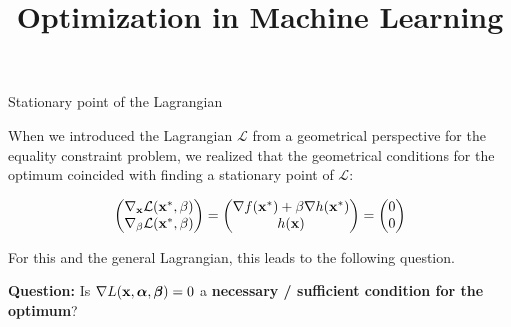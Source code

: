 \documentclass[11pt,compress,t,notes=noshow, xcolor=table]{beamer}
\title{Optimization in Machine Learning}
\begin{document}

\begin{vbframe}{Stationary point of the Lagrangian}

When we introduced the Lagrangian $\mathcal{L}$ from a geometrical
perspective for the equality constraint problem, 
we realized that the geometrical conditions for the optimum
coincided with finding a stationary point of $\mathcal{L}$: 

$$
  \begin{pmatrix}
  \nabla_{\mathbf{x}} \mathcal{L}(\mathbf{x}^\ast, \beta) \\
  \nabla_\beta \mathcal{L}(\mathbf{x}^\ast, \beta)
  \end{pmatrix} = \begin{pmatrix} \nabla f(\mathbf{x}^\ast) + \beta \nabla h(\mathbf{x}^\ast) \\
  h(\mathbf{x})
  \end{pmatrix} = \begin{pmatrix}
  0 \\ 0 \end{pmatrix}
$$

\lz

For this and the general Lagrangian, this leads to the following question.
\lz

\textbf{Question: } Is $\nabla L(\mathbf{x}, \bm{\alpha}, \bm{\beta}) = 0$ a \textbf{necessary / sufficient condition for the optimum}?

\end{vbframe}
\end{document}

